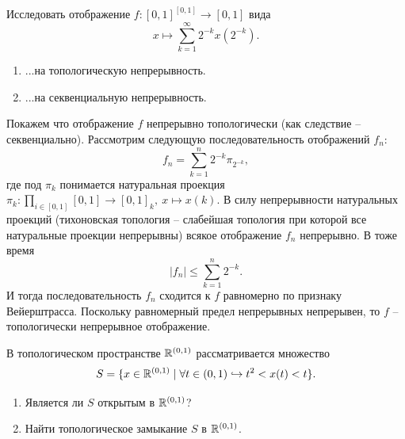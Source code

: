 \begin{task}[T6]
    Исследовать отображение $f\colon [0, 1]^{[0, 1]} \to [0, 1]$ вида
    \[
        x \mapsto \sum\limits_{k = 1}^{\infty} 2^{-k}x(2^{-k}).
    \]
    \begin{enumerate}
        \item ...на топологическую непрерывность.
        \item ...на секвенциальную непрерывность.
    \end{enumerate}
\end{task}
\begin{solve}
    Покажем что отображение $f$ непрерывно топологически (как следствие -- секвенциально). Рассмотрим следующую последовательность отображений $f_n\colon$
    \[
        f_n = \sum\limits_{k = 1}^n 2^{-k} \pi_{2^{-k}},
    \]
    где под $\pi_k$ понимается натуральная проекция $\pi_k \colon \prod_{i \in [0, 1]} [0, 1] \to [0, 1]_k, \ x \mapsto x(k)$. В силу непрерывности натуральных проекций (тихоновская топология -- слабейшая топология при которой все натуральные проекции непрерывны) всякое отображение $f_n$ непрерывно. В тоже время
    \[
        |f_n| \leq \sum\limits_{k = 1}^n 2^{-k}.
    \]
    И тогда последовательность $f_n$ сходится к $f$ равномерно по признаку Вейерштрасса. Поскольку равномерный предел непрерывных непрерывен, то $f$ -- топологически непрерывное отображение.
\end{solve}
\begin{task}[T7]
    В топологическом пространстве $\mathbb{R}^{(0, 1)}$ рассматривается множество
    \[
        S = \{x \in \mathbb{R}^{(0, 1)} \mid \forall t \in (0, 1) \hookrightarrow t^2 < x(t) < t\}.
    \]
    \begin{enumerate}
        \item Является ли $S$ открытым в $\mathbb{R}^{(0, 1)}$?
        \item Найти топологическое замыкание $S$ в $\mathbb{R}^{(0, 1)}$.
    \end{enumerate}
\end{task}
